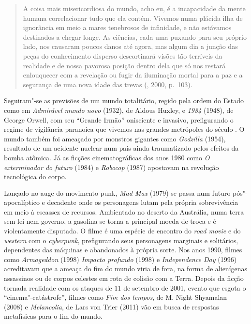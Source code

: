 \begin{quote}
A coisa mais misericordiosa do mundo, acho eu, é a incapacidade da mente humana correlacionar tudo que ela contém. Vivemos numa plácida ilha de ignorância em meio a mares tenebrosos de infinidade, e não estávamos destinados a chegar longe. As ciências, cada uma puxando para seu próprio lado, nos causaram poucos danos até agora, mas algum dia a junção das peças do conhecimento disperso descortinará visões tão terríveis da realidade e de nossa pavorosa posição dentro dela que só nos restará enlouquecer com a revelação ou fugir da iluminação mortal para a paz e a segurança de uma nova idade das trevas (, 2000, p.~103).
\end{quote}

Seguiram"-se as previsões
de um mundo totalitário, regido pela ordem do Estado como em
\emph{Admirável mundo novo} (1932), de Aldous Huxley, e \emph{1984} (1948), de George Orwell, com seu
``Grande Irmão'' onisciente e invasivo, prefigurando o regime de
vigilância paranoica que vivemos nas grandes metrópoles do século . O
mundo também foi ameaçado por monstros gigantes como \emph{Godzilla} (1954),
resultado de um acidente nuclear num país ainda traumatizado pelos
efeitos da bomba atômica. Já as ficções cinematográficas dos anos 1980
como \emph{O exterminador do futuro} (1984) e \emph{Robocop} (1987)
apostavam na revolução tecnológica do corpo.

Lançado no auge do movimento punk, \emph{Mad Max} (1979) se passa num
futuro pós"-apocalíptico e decadente onde os personagens lutam pela
própria sobrevivência em meio à escassez de recursos. Ambientado no
deserto da Austrália, numa terra sem lei nem governo, a gasolina se
torna a principal moeda de troca e é violentamente disputada. O filme é
uma espécie de encontro do \emph{road movie} e do \emph{western} com o
\emph{cyberpunk}, prefigurando seus personagens marginais e solitários,
dependentes das máquinas e abandonados à própria sorte. Nos anos 1990,
filmes como \emph{Armageddon} (1998) \emph{Impacto profundo}
(1998) e \emph{Independence Day} (1996) acreditavam que a ameaça do fim
do mundo viria de fora, na forma de alienígenas assassinos ou de corpos
celestes em rota de colisão com a Terra. Depois da ficção tornada
realidade com os ataques de 11 de setembro de 2001, evento que esgota o
``cinema"-catástrofe'', filmes como \emph{Fim dos tempos}, de M. Night
Shyamalan (2008) e \emph{Melancolia}, de Lars von Trier (2011) vão em
busca de respostas metafísicas para o fim do mundo.

